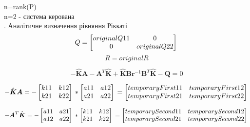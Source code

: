 \documentclass[a4paper]{article}
\begin{document}
\hfill \break
\indent \indent n=rank(P)\\
\hfill \break
\indent \indent n=2 - система керована\\

\hfill \break
{}. Аналітичне визначення рівняння Ріккаті\\

\[
Q =
\begin{bmatrix}
    {{originalQ11}} & 0 \\
    0 & {{originalQ22}} \\
\end{bmatrix}\\
\]
\[
R = {{originalR}}
\]

\[
-\hat{\boldsymbol{K}}\boldsymbol{A} - \boldsymbol{A}^T\hat{\boldsymbol{K}} + \hat{\boldsymbol{K}}\boldsymbol{B}\boldsymbol{r}^{-1}\boldsymbol{B}^T\hat{\boldsymbol{K}}-\boldsymbol{Q} = 0
\]

\[
-\hat{\boldsymbol{K}}\boldsymbol{A} =
-\begin{bmatrix}
    k11 & k12 \\
    k21 & k22 \\
\end{bmatrix}\\ *
\begin{bmatrix}
    {{a11}} & {{a12}} \\
    {{a21}} & {{a22}} \\
\end{bmatrix}\\ = 
\begin{bmatrix}
    {{temporaryFirst11}} & {{temporaryFirst12}} \\
    {{temporaryFirst21}} & {{temporaryFirst22}} \\
\end{bmatrix}\\
\]

\[
-\boldsymbol{A}^T\hat{\boldsymbol{K}} =
-\begin{bmatrix}
    {{a11}} & {{a21}} \\
    {{a12}} & {{a22}} \\
\end{bmatrix}\\ *
\begin{bmatrix}
    k11 & k12 \\
    k21 & k22 \\
\end{bmatrix}\\ = 
\begin{bmatrix}
    {{temporarySecond11}} & {{temporarySecond12}} \\
    {{temporarySecond21}} & {{temporarySecond22}} \\
\end{bmatrix}\\
\]
\end{document}
